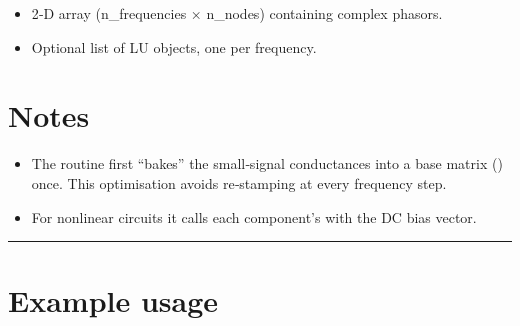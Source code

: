 \documentclass[letterpaper,10pt,english]{sphinxmanual}
\begin{document}
\begin{fulllineitems}
\begin{description}
\begin{itemize}
\item {} 
\sphinxAtStartPar
{} \textendash{} 2‑D array (n\_frequencies × n\_nodes) containing complex phasors.

\item {} 
\sphinxAtStartPar
{} \textendash{} Optional list of LU objects, one per frequency.

\end{itemize}

\end{description}


\section{Notes}
\label{\detokenize{ac_engine:notes}}\begin{itemize}
\item {} 
\sphinxAtStartPar
The routine first “bakes” the small‑signal conductances into a base matrix
() once.  This optimisation avoids re‑stamping at every
frequency step.

\item {} 
\sphinxAtStartPar
For nonlinear circuits it calls each component’s
 with the DC bias vector.

\end{itemize}

\end{fulllineitems}



\bigskip\hrule\bigskip



\section{Example usage}
\label{\detokenize{ac_engine:example-usage}}
\begin{sphinxVerbatim}[commandchars=\\\{\}]
 
 

   
    
\end{sphinxVerbatim}
\end{document}
